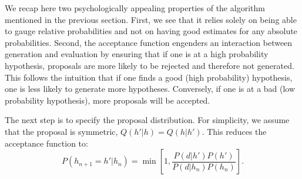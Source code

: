 We recap here two psychologically appealing properties of the algorithm mentioned in the previous section. First, we see that it relies solely on being able to gauge relative probabilities and not on having good estimates for any absolute probabilities. Second, the acceptance function engenders an interaction between generation and evaluation by ensuring that if one is at a high probability hypothesis, proposals are more likely to be rejected and therefore not generated. This follows the intuition  that if one finds a good (high probability) hypothesis, one is less likely to generate more hypotheses. Conversely, if one is at a bad (low probability hypothesis), more proposals will be accepted.


The next step is to specify the proposal distribution. For simplicity, we assume that the proposal is symmetric, $Q(h'|h) = Q(h|h')$. This reduces the acceptance function to:
\begin{equation}
\label{eq:acceptance}
P(h_{n+1}=h'|h_n) = \min\left[1, \frac{P(d|h')P(h')}{P(d|h_n) P(h_n)} \right].
\end{equation}


